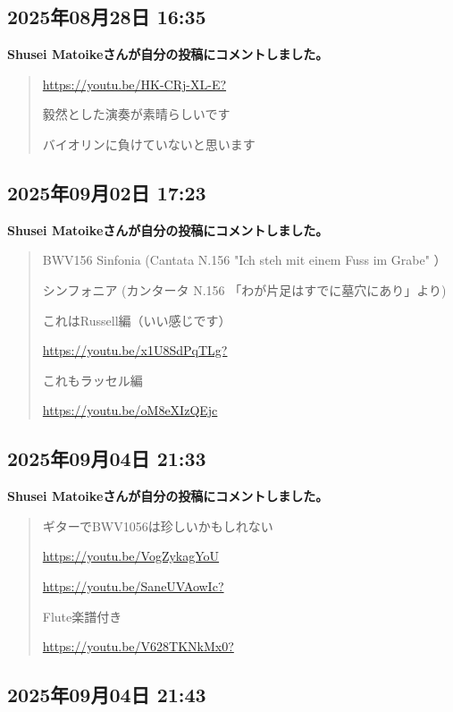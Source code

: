 \subsection*{2025年08月28日 16:35}

\textbf{Shusei Matoikeさんが自分の投稿にコメントしました。}

\begin{quote}
\url{https://youtu.be/HK-CRj-XL-E?}

毅然とした演奏が素晴らしいです

バイオリンに負けていないと思います
\end{quote}

\subsection*{2025年09月02日 17:23}

\textbf{Shusei Matoikeさんが自分の投稿にコメントしました。}

\begin{quote}
BWV156 Sinfonia (Cantata N.156 "Ich steh mit einem Fuss im Grabe" ）

シンフォニア (カンタータ N.156 「わが片足はすでに墓穴にあり」より)

これはRussell編（いい感じです）

\url{https://youtu.be/x1U8SdPqTLg?}

これもラッセル編

\url{https://youtu.be/oM8eXIzQEjc}
\end{quote}

\subsection*{2025年09月04日 21:33}

\textbf{Shusei Matoikeさんが自分の投稿にコメントしました。}

\begin{quote}
ギターでBWV1056は珍しいかもしれない

\url{https://youtu.be/VogZykagYoU}

\url{https://youtu.be/SaneUVAowIc?}

Flute楽譜付き

\url{https://youtu.be/V628TKNkMx0?}
\end{quote}

\subsection*{2025年09月04日 21:43}

